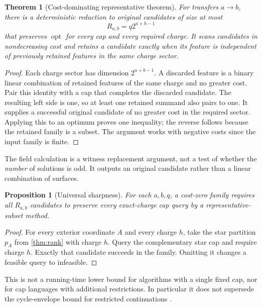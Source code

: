 \documentclass[11pt,a4paper]{article}
\newtheorem{theorem}{Theorem}[section]
\newtheorem{proposition}[proposition]{Proposition}
\theoremstyle{definition}
\begin{document}
\begin{theorem}[Cost-dominating representative theorem]\label{thm:weighted}
For transfers $a\to b$, there is a deterministic reduction to original candidates of size at most
\[
R_{a,b}=q2^{a+b-1}
\]
that preserves $\operatorname{opt}$ for every cap and every required charge. It scans candidates in nondecreasing cost and retains a candidate exactly when its feature is independent of previously retained features in the same charge sector.
\end{theorem}
\begin{proof}
Each charge sector has dimension $2^{a+b-1}$. A discarded feature is a binary linear combination of retained features of the same charge and no greater cost. Pair this identity with a cap that completes the discarded candidate. The resulting left side is one, so at least one retained summand also pairs to one. It supplies a successful original candidate of no greater cost in the required sector. Applying this to an optimum proves one inequality; the reverse follows because the retained family is a subset. The argument works with negative costs since the input family is finite.
\end{proof}

The field calculation is a witness replacement argument, not a test of whether the \emph{number} of solutions is odd. It outputs an original candidate rather than a linear combination of surfaces.

\begin{proposition}[Universal sharpness]\label{prop:sharp}
For each $a,b,q$, a cost-zero family requires all $R_{a,b}$ candidates to preserve every exact-charge cap query by a representative-subset method.
\end{proposition}
\begin{proof}
For every exterior coordinate $A$ and every charge $h$, take the star partition $p_A$ from \cref{thm:rank} with charge $h$. Query the complementary star cap and require charge $h$. Exactly that candidate succeeds in the family. Omitting it changes a feasible query to infeasible.
\end{proof}
This is not a running-time lower bound for algorithms with a single fixed cap, nor for cap languages with additional restrictions. In particular it does not supersede the cycle-envelope bound for restricted continuations \cite{cycle}.
\end{document}
